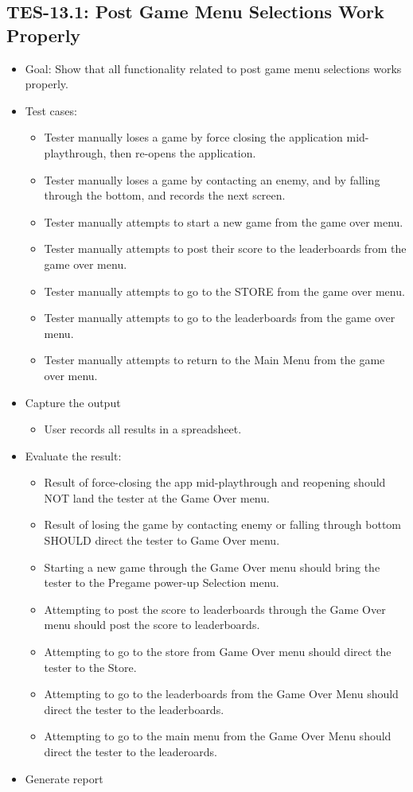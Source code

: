 \subsection{TES-13.1: Post Game Menu Selections Work Properly }
\begin{itemize}
\item Goal: Show that all functionality related to post game menu selections works properly. 
\item Test cases: 

\begin{itemize}
\item Tester manually loses a game by force closing the application mid-playthrough, then re-opens the application.
\item Tester manually loses a game by contacting an enemy, and by falling through the bottom, and records the next screen.
\item Tester manually attempts to start a new game from the game over menu.
\item Tester manually attempts to post their score to the leaderboards from the game over menu.
\item Tester manually attempts to go to the STORE from the game over menu.
\item Tester manually attempts to go to the leaderboards from the game over menu.
\item Tester manually attempts to return to the Main Menu from the game over menu.
\end{itemize}
\item Capture the output 
\begin{itemize}
\item User records all results in a spreadsheet.
\end{itemize}
\item Evaluate the result: 

\begin{itemize}
\item Result of force-closing the app mid-playthrough and reopening should NOT land the tester at the Game Over menu.
\item Result of losing the game by contacting enemy or falling through bottom SHOULD direct the tester to Game Over menu.
\item Starting a new game through the Game Over menu should bring the tester to the Pregame power-up Selection menu.
\item Attempting to post the score to leaderboards through the Game Over menu should post the score to leaderboards.
\item Attempting to go to the store from Game Over menu should direct the tester to the Store.
\item Attempting to go to the leaderboards from the Game Over Menu should direct the tester to the leaderboards.
\item Attempting to go to the main menu from the Game Over Menu should direct the tester to the leaderoards.
\end{itemize}
\item Generate report 
\end{itemize}


